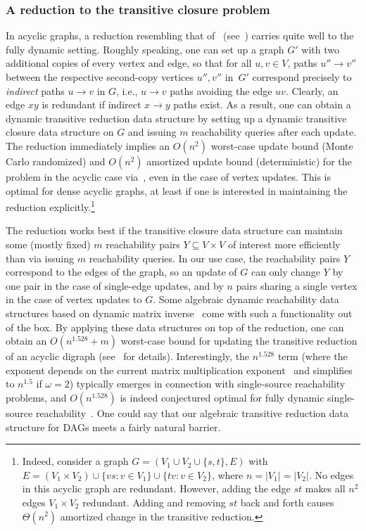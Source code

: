 \documentclass[11pt]{article}
\begin{document}
\subsubsection{A reduction to the transitive closure problem}
In acyclic graphs, a reduction resembling that of~\cite{Aho:1972aa} (see~) carries quite well to the fully dynamic setting.
Roughly speaking, one can set up a graph $G'$ with two additional copies of every vertex and edge, so that for all $u,v\in V$, paths $u''\to v''$ between the respective second-copy vertices $u'',v''$ in~$G'$ correspond precisely to \emph{indirect} paths $u\to v$ in $G$, i.e.,
$u\to v$ paths avoiding the edge $uv$.
Clearly, an edge $xy$ is redundant if indirect $x\to y$ paths exist.
As a result, one can obtain a dynamic transitive reduction data structure by setting up a dynamic transitive closure data structure on $G$ and issuing $m$ reachability queries after each update.
The reduction immediately implies an $O(n^2)$ worst-case update bound (Monte Carlo randomized) and $O(n^2)$ amortized update bound (deterministic)
for the problem in the acyclic case via~\cite{Roditty08, Sankowski04}, even in the case of vertex updates. This is optimal for dense acyclic graphs, at least if one is interested in maintaining the reduction explicitly.\footnote{Indeed, consider a graph $G=(V_1\cup V_2\cup \{s,t\},E)$ with $E=(V_1\times V_2)\cup \{vs:v\in V_1\}\cup \{tv:v\in V_2\}$, where $n=|V_1|=|V_2|$. No edges in this acyclic graph are redundant. However, adding the edge $st$ makes all $n^2$ edges $V_1\times V_2$ redundant. Adding and removing $st$ back and forth causes $\Theta(n^2)$ amortized change in the transitive reduction.}

The reduction works best if the transitive closure data structure can maintain some (mostly fixed) $m$ reachability pairs $Y\subseteq V\times V$ of interest more efficiently than via issuing $m$ reachability queries. In our use case, the reachability pairs $Y$ correspond to the edges of the graph, so an update of $G$ can only change $Y$ by one pair in the case of single-edge updates, and by $n$ pairs sharing a single vertex in the case of vertex updates to $G$.
Some algebraic dynamic reachability data structures based on dynamic matrix inverse~\cite{Sankowski04, DBLP:conf/cocoon/Sankowski05} come with such a functionality out of the box. By applying these data structures on top of the reduction, one can obtain an $O(n^{1.528}+m)$ worst-case bound for updating the transitive reduction of an acyclic digraph (see~ for details). Interestingly, the $n^{1.528}$ term (where the exponent depends on the current matrix multiplication exponent~\cite{williams2024new} and simplifies to $n^{1.5}$ if $\omega=2$) typically emerges in connection with single-source reachability problems, and $O(n^{1.528})$ is indeed conjectured optimal for fully dynamic single-source reachability~\cite{BrandNS19}. One could say that our algebraic transitive reduction data structure for DAGs meets a fairly natural barrier.
\end{document}

